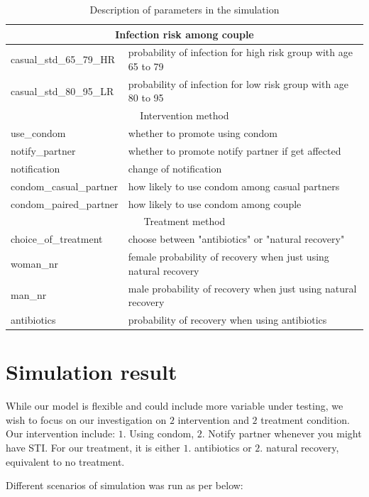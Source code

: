 \documentclass{article}
\begin{document}
\begin{normalsize}
\begin{table}[H]
\begin{tabular}{ |p{5cm}|p{7cm}| }
    		\hline
    		\multicolumn{2}{|c|}{Infection risk among couple} \\
    		\hline
    		casual\_std\_65\_79\_HR & probability of infection for high risk group with age 65 to 79\\
    		casual\_std\_80\_95\_LR & probability of infection for low risk group with age 80 to 95\\
    		\hline
    		\multicolumn{2}{|c|}{Intervention method} \\
    		\hline
    		use\_condom & whether to promote using condom\\
    		notify\_partner & whether to promote notify partner if get affected\\
    		notification & change of notification\\
    		condom\_casual\_partner & how likely to use condom among casual partners\\
    		condom\_paired\_partner & how likely to use condom among couple\\
    		\hline
    		\multicolumn{2}{|c|}{Treatment method} \\
    		\hline
    		choice\_of\_treatment & choose between "antibiotics" or "natural recovery"\\
    		woman\_nr & female probability of recovery when just using natural recovery\\
    		man\_nr & male probability of recovery when just using natural recovery\\
    		antibiotics & probability of recovery when using antibiotics\\
    		\hline
    	\end{tabular}
  
    	\caption{Description of parameters in the simulation}
    	\label{tab:parameter2}
   \end{table}

\section{Simulation result}
While our model is flexible and could include more variable under testing, we wish to focus on our investigation on $2$ intervention and $2$ treatment condition. Our intervention include: $1.$ Using condom, $2.$ Notify partner whenever you might have STI. For our treatment, it is either $1.$ antibiotics or $2.$ natural recovery, equivalent to no treatment.

Different scenarios of simulation was run as per below:


\end{normalsize}
\end{document}
